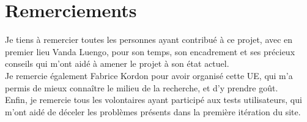 \documentclass{article}
\begin{document}
\section{Remerciements}
Je tiens à remercier toutes les personnes ayant contribué à ce projet, avec en premier lieu Vanda Luengo, pour son temps, son encadrement et ses précieux conseils qui m'ont aidé à amener le projet à son état actuel.\\
Je remercie également Fabrice Kordon pour avoir organisé cette UE, qui m'a permis de mieux connaître le milieu de la recherche, et d'y prendre goût.\\
Enfin, je remercie tous les volontaires ayant participé aux tests utilisateurs, qui m'ont aidé de déceler les problèmes présents dans la première itération du site.

{}


\newpage
\appendix
{}



\end{document}
